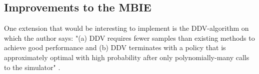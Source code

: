 \subsection{Improvements to the MBIE }
One extension that would be interesting to implement is the DDV-algorithm on which the author says: "(a) DDV requires fewer samples than existing methods to
achieve good performance and (b) DDV terminates with a
policy that is approximately optimal with high probability
after only polynomially-many calls to the simulator" \parencite{dietterich2013pac}.